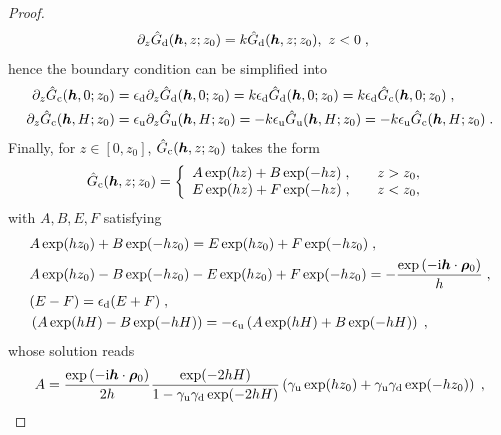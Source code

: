 \begin{proof}
\begin{align*}
     \partial_z\Hat{G}_{\mathrm{d}}(\boldsymbol{h}, z; z_0)&=k\Hat{G}_{\mathrm{d}}(\boldsymbol{h}, z; z_0),~z < 0\;,
\end{align*}
hence the boundary condition can be  simplified into
\begin{align*}
  \partial_z\Hat{G}_{\mathrm{c}}(\boldsymbol{h}, 0; z_0)&=\epsilon_{\mathrm{d}} \partial_z\Hat{G}_{\mathrm{d}}(\boldsymbol{h}, 0; z_0)=k\epsilon_{\mathrm{d}} \Hat{G}_{\mathrm{d}}(\boldsymbol{h}, 0; z_0)=k\epsilon_{\mathrm{d}} \Hat{G}_{\mathrm{c}}(\boldsymbol{h}, 0; z_0)\;,\\
   \partial_z\Hat{G}_{\mathrm{c}}(\boldsymbol{h}, H; z_0)&=\epsilon_{\mathrm{u}} \partial_z\Hat{G}_{\mathrm{u}}(\boldsymbol{h}, H; z_0)=-k\epsilon_{\mathrm{u}} \Hat{G}_{\mathrm{u}}(\boldsymbol{h}, H; z_0)=-k\epsilon_{\mathrm{u}} \Hat{G}_{\mathrm{c}}(\boldsymbol{h}, H; z_0)\;.
\end{align*} 
Finally, for $z\in[0, z_0]$, $\Hat{G}_{\mathrm{c}}(\boldsymbol{h}, z; z_0)$ takes the form
\begin{equation*}
    \Hat{G}_{\mathrm{c}}(\boldsymbol{h}, z; z_0)=\left \{
            \begin{array}{cc}
                \begin{aligned}
                    & A\exp(h z)+B\exp(-h z)\;,
                \end{aligned} & z>z_0, \\
                \begin{aligned}
                 & E\exp(h z)+F\exp(-h z)\;,
                \end{aligned} & z<z_0,
            \end{array}
        \right. \;
\end{equation*}
with $A, B, E, F$ satisfying
\begin{equation}\label{proof...Matrix}
\begin{aligned}
 &A\exp(hz_0)+B\exp(-hz_0)  = E\exp(hz_0)+F\exp(-hz_0)\;,\\
 &A\exp(hz_0)-B\exp(-hz_0)-E\exp(hz_0)+F\exp(-hz_0)=-\frac{ \exp{(-\mathrm{i} \boldsymbol{h} \cdot \boldsymbol{\rho}_0)}}{h }\;,\\
 & (E-F)=\epsilon_{\mathrm{d}}(E+F)\;,\\
 & \left(A\exp(hH)-B\exp(-hH)\right)=-\epsilon_{\mathrm{u}}\left(A\exp(hH)+B\exp(-hH)\right)\;,
\end{aligned}\end{equation}
whose solution reads
\begin{align*}
A&=\frac{ \exp{(-\mathrm{i} \V{h} \cdot \V{\rho}_0)}}{2h }\frac{\exp(-2hH)}{1-\gamma_{\mrm{u}}\gamma_{\mrm{d}}\exp(-2hH)} \left(\gamma_{\mrm{u}}\exp(hz_0)+\gamma_{\mrm{u}}\gamma_{\mrm{d}}\exp(-hz_0)\right)\;,\\

\end{align*}
\end{proof}
